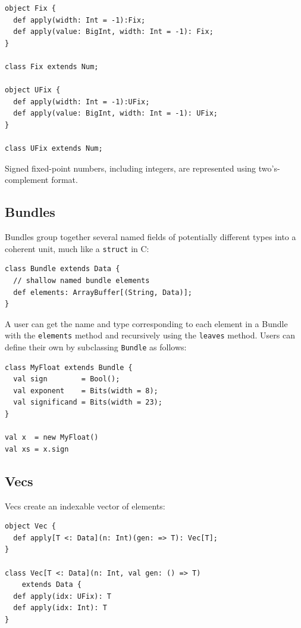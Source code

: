 \documentclass[10pt,twocolumn]{article}
\def\code#1{{\small\tt #1}}
\begin{document}
\begin{lstlisting}
object Fix {
  def apply(width: Int = -1):Fix;
  def apply(value: BigInt, width: Int = -1): Fix;
}

class Fix extends Num; 

object UFix {
  def apply(width: Int = -1):UFix;
  def apply(value: BigInt, width: Int = -1): UFix;
}

class UFix extends Num; 
\end{lstlisting}

\noindent
Signed fixed-point
numbers, including integers, are represented using two's-complement
format.  

\subsection{Bundles}

Bundles group together several named fields of potentially different
types into a coherent unit, much like a \code{struct} in C:

\begin{lstlisting}
class Bundle extends Data {
  // shallow named bundle elements
  def elements: ArrayBuffer[(String, Data)];
}
\end{lstlisting}

\noindent
A user can get the name and type corresponding to each element in a
Bundle with the \code{elements} method and recursively using the
\code{leaves} method. 
Users can define their own by subclassing \code{Bundle} as follows:

\begin{lstlisting}
class MyFloat extends Bundle {
  val sign        = Bool();
  val exponent    = Bits(width = 8);
  val significand = Bits(width = 23);
}

val x  = new MyFloat()
val xs = x.sign
\end{lstlisting}

\subsection{Vecs}

Vecs create an indexable vector of elements: 

\begin{lstlisting}
object Vec {
  def apply[T <: Data](n: Int)(gen: => T): Vec[T];
}

class Vec[T <: Data](n: Int, val gen: () => T) 
    extends Data {
  def apply(idx: UFix): T
  def apply(idx: Int): T
}
\end{lstlisting}
\end{document}
